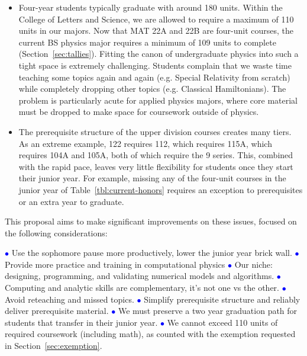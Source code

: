 \documentclass[12pt]{article}
\newcommand{\tcb}{\textcolor{blue}}
\begin{document}
\begin{itemize}
\item Four-year students typically graduate with around 180 units.  Within the College of Letters
  and Science, we are allowed to require a maximum of 110 units in our majors.  Now that MAT 22A and
  22B are four-unit courses, the current BS physics major requires a minimum of 109 units to
  complete (Section~\ref{sec:tallies}).  Fitting the canon of undergraduate physics into such a tight space is
  extremely challenging.  Students complain that we waste time teaching some topics again and again
  (e.g. Special Relativity from scratch) while completely dropping other topics (e.g. Classical
  Hamiltonians).  The problem is particularly acute for applied physics majors, where core material
  must be dropped to make space for coursework outside of physics.

\item The prerequisite structure of the upper division courses creates
  many tiers.  As an extreme example, 122 requires 112, which requires
  115A, which requires 104A and 105A, both of which require the 9
  series.  This, combined with the rapid pace, leaves very little
  flexibility for students once they start their junior year.  For
  example, missing any of the four-unit courses in the junior year of
  Table~\ref{tbl:current-honors} requires an exception to
  prerequisites or an extra year to graduate.
\end{itemize}

This proposal aims to make significant improvements on these
issues, focused on the following considerations:

\vskip0.10in \noindent \tcb{$\bullet$}
Use the sophomore pause more productively, lower the junior year brick wall.
\vskip0.04in \noindent \tcb{$\bullet$}
Provide more practice and training in computational physics
\vskip0.04in \noindent \tcb{$\bullet$}
Our niche: designing, programming, and validating numerical models and algorithms.
\vskip0.04in \noindent \tcb{$\bullet$}
Computing and analytic skills are complementary, it's not one vs the other.
\vskip0.04in \noindent \tcb{$\bullet$}
Avoid reteaching and missed topics.
\vskip0.04in \noindent \tcb{$\bullet$}
Simplify prerequisite structure and reliably deliver prerequisite material.
\vskip0.04in \noindent \tcb{$\bullet$}
We must preserve a two year graduation path for students that transfer in their junior year.
\vskip0.04in \noindent \tcb{$\bullet$}
We cannot exceed 110 units of required coursework (including math), as counted with the exemption requested in Section~\ref{sec:exemption}.
\end{document}
